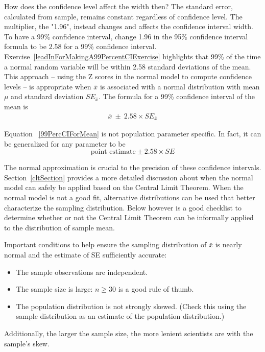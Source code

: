 How does the confidence level affect the width then? The standard error, calculated from sample, remains constant regardless of confidence level. The multiplier, the "1.96", instead changes and affects the confidence interval width. To have a 99\% confidence interval, change 1.96 in the 95\% confidence interval formula to be $2.58$ for a 99\% confidence interval. Exercise~\ref{leadInForMakingA99PercentCIExercise} highlights that 99\% of the time a normal random variable will be within 2.58 standard deviations of the mean. This approach -- using the Z scores in the normal model to compute confidence levels -- is appropriate when $\bar{x}$ is associated with a normal distribution with mean $\mu$ and standard deviation $SE_{\bar{x}}$. The formula for a 99\% confidence interval of the mean is
\begin{eqnarray}
\bar{x}\ \pm\ 2.58\times SE_{\bar{x}}
\label{99PercCIForMean}
\end{eqnarray}

Equation ~\ref{99PercCIForMean} is not population parameter specific. In fact, it can be generalized for any parameter to be \[\text{point estimate} \pm 2.58\times SE\]

The normal approximation is crucial to the precision of these confidence intervals. Section~\ref{cltSection} provides a more detailed discussion about when the normal model can safely be applied based on the Central Limit Theorem. When the normal model is not a good fit, alternative distributions can be used that better characterize the sampling distribution. Below however is a good checklist to determine whether or not the Central Limit Theorem can be informally applied to the distribution of sample mean.

\begin{termBox}{
Important conditions to help ensure the sampling distribution of $\bar{x}$ is nearly normal and the estimate of SE sufficiently accurate:
\begin{itemize}
\setlength{\itemsep}{0mm}
\item The sample observations are independent.
\item The sample size is large: $n\geq30$ is a good rule of thumb.
\item The population distribution is not strongly skewed. (Check this using the sample distribution as an estimate of the population distribution.)
\end{itemize}
Additionally, the larger the sample size, the more lenient scientists are with the sample's skew.}
\end{termBox}

